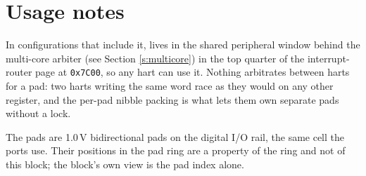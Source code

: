 \section{Usage notes}

In configurations that include it,  lives in the shared peripheral window behind the multi-core arbiter (see Section \ref{s:multicore}) in the top quarter of the interrupt-router page at \texttt{0x7C00}, so any hart can use it. Nothing arbitrates between harts for a pad: two harts writing the same  word race as they would on any other register, and the per-pad nibble packing is what lets them own separate pads without a lock.

The pads are 1.0\,V bidirectional pads on the digital I/O rail, the same cell the  ports use. Their positions in the pad ring are a property of the ring and not of this block; the block's own view is the pad index alone.
